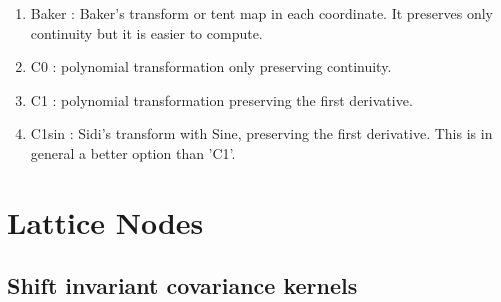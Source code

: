 \documentclass[handout, 10pt,compress,xcolor={usenames,dvipsnames}]{beamer} %
\begin{document}
\begin{enumerate}
\item Baker : Baker's transform or tent map in each coordinate. It preserves only continuity but it is easier to compute.
\item C0 : polynomial transformation only preserving continuity.
\item C1 : polynomial transformation preserving the first derivative.
\item C1sin : Sidi's transform with Sine, preserving the first derivative. This is in general a better option than 'C1'.
\end{enumerate}
\fi

































\section{Lattice Nodes}


\subsection{Shift invariant covariance kernels}
\end{document}
